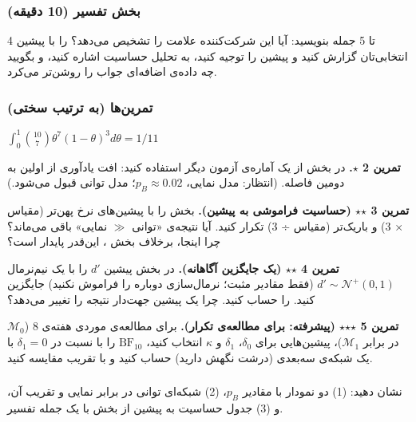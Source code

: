 \subsubsection{\texorpdfstring{بخش  تفسیر (10
دقیقه)}{بخش E: تفسیر (10 دقیقه)}}

4 تا 5 جمله بنویسید: آیا این شرکت‌کننده علامت را تشخیص می‌دهد؟  را با پیشین انتخابی‌تان گزارش کنید و پیشین را توجیه کنید، به
تحلیل حساسیت اشاره کنید، و بگویید چه داده‌ی اضافه‌ای جواب را روشن‌تر می‌کرد.

\subsubsection{تمرین‌ها (به ترتیب سختی)}

\(\int_0^1 \binom{10}{7}\theta^7(1-\theta)^3 d\theta = 1/11\)

\textbf{تمرین 2 \ensuremath{\star}.} در بخش  از یک آماره‌ی آزمون دیگر استفاده کنید:
افت یادآوری از اولین به دومین فاصله. (انتظار: مدل نمایی،
\(p_B \approx 0.02\)؛ مدل توانی قبول می‌شود.)

\textbf{تمرین 3 \ensuremath{\star}\ensuremath{\star} (حساسیت  فراموشی به پیشین).} بخش
 را با پیشین‌های نرخ پهن‌تر (مقیاس × 3) و باریک‌تر (مقیاس ÷ 3) تکرار
کنید. آیا نتیجه‌ی «توانی \ensuremath{\gg} نمایی» باقی می‌ماند؟ چرا اینجا، برخلاف بخش
، این‌قدر پایدار است؟

\textbf{تمرین 4 \ensuremath{\star}\ensuremath{\star} (یک جایگزین آگاهانه).} در بخش  پیشین \(d'\) را
با یک نیم‌نرمال \(d' \sim \mathcal{N}^+(0, 1)\) (فقط مقادیر مثبت؛
نرمال‌سازی دوباره را فراموش نکنید) جایگزین کنید.  را حساب کنید. چرا یک پیشین جهت‌دار نتیجه را تغییر می‌دهد؟

\textbf{تمرین 5 \ensuremath{\star}\ensuremath{\star}\ensuremath{\star} (پیشرفته:  برای مطالعه‌ی تکرار).}
برای مطالعه‌ی موردی هفته‌ی 8 (\(\mathcal{M}_0\) در برابر
\(\mathcal{M}_1\))، پیشین‌هایی برای \(\delta_0\)، \(\delta_1\) و
\(\kappa\) انتخاب کنید، \(\mathrm{BF}_{10}\) را با نسبت
 در \(\delta_1 = 0\) با یک شبکه‌ی سه‌بعدی (درشت نگهش
دارید) حساب کنید و با تقریب  مقایسه کنید.

\subsubsection{\texorpdfstring{}{lab check-off}}

نشان دهید: (1) دو نمودار  با مقادیر \(p_B\)، (2)  شبکه‌ای توانی در برابر نمایی و تقریب  آن، و (3) جدول
حساسیت به پیشین از بخش  با یک جمله تفسیر.

